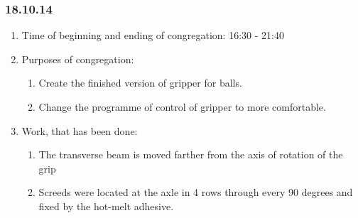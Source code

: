 
\subsubsection{18.10.14}

\begin{enumerate}
	\item Time of beginning and ending of congregation:
	16:30 - 21:40
	\item Purposes of congregation:
	\begin{enumerate}
	  \item Create the finished version of gripper for balls.
	  
	  \item Change the programme of control of gripper to more comfortable.
	  
    \end{enumerate}
    
	\item Work, that has been done:
	\begin{enumerate}
	  \item The transverse beam is moved farther from the axis of rotation of the grip
      
      \item Screeds were located at the axle in 4 rows through every 90 degrees and fixed by the hot-melt adhesive.
      

\end{enumerate}
\end{enumerate}
